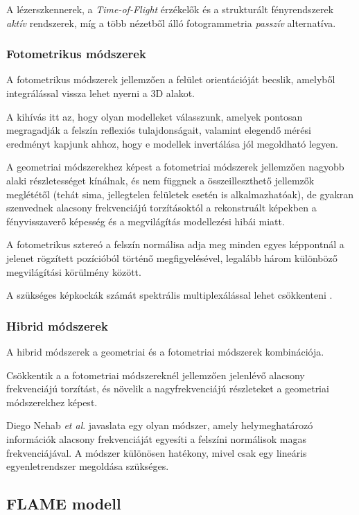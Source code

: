 \documentclass[12pt,a4]{article}
\begin{document}
	
	A lézerszkennerek, a \textit{Time-of-Flight} érzékelők és a strukturált fényrendszerek \textit{aktív} rendszerek, míg a több nézetből álló fotogrammetria \textit{passzív} alternatíva.
	
	\subsubsection{Fotometrikus módszerek}
	A fotometrikus módszerek \cite{3dmm} jellemzően a felület orientációját becslik, amelyből integrálással vissza lehet nyerni a 3D alakot.
	
	 A kihívás itt az, hogy olyan modelleket válasszunk, amelyek pontosan megragadják a felszín reflexiós tulajdonságait, valamint elegendő mérési eredményt kapjunk ahhoz, hogy e modellek invertálása jól megoldható legyen. 
	 
	 A geometriai módszerekhez képest a fotometriai módszerek
	 jellemzően nagyobb alaki részletességet kínálnak, és nem függnek a
	 összeilleszthető jellemzők meglététől
	(tehát sima, jellegtelen felületek esetén is alkalmazhatóak), de gyakran szenvednek alacsony frekvenciájú torzításoktól a rekonstruált képekben
	a fényvisszaverő képesség és a megvilágítás modellezési hibái miatt.
	
	
	A fotometrikus sztereó \cite{photometric} a felszín normálisa adja meg minden egyes képpontnál a jelenet rögzített pozícióból történő megfigyelésével, legalább három különböző megvilágítási körülmény között.
	
	 A szükséges képkockák számát spektrális multiplexálással lehet csökkenteni \cite{multiplex}.
	
	\subsubsection{Hibrid módszerek}
	A hibrid módszerek \cite{3dmm} a
	geometriai és a fotometriai módszerek kombinációja. 
	
	Csökkentik a
	a fotometriai módszereknél jellemzően jelenlévő alacsony frekvenciájú torzítást, és
	növelik a nagyfrekvenciájú részleteket a geometriai módszerekhez képest. 
	
	Diego Nehab \textit{et al}. \cite{hibrid} javaslata egy olyan módszer, amely helymeghatározó információk alacsony frekvenciáját egyesíti a felszíni normálisok magas frekvenciájával. 
	A módszer különösen hatékony, mivel csak egy lineáris egyenletrendszer megoldása szükséges. 

    \subsection{FLAME modell}
\end{document}
